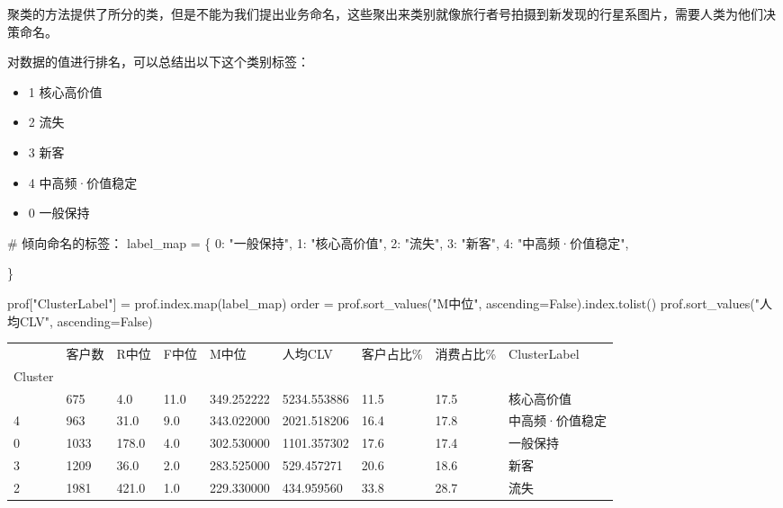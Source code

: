 \documentclass[
]{ctexart}
\newenvironment{Shaded}{\begin{snugshade}}{\end{snugshade}}
\newcommand{\BuiltInTok}[1]{\textcolor[rgb]{0.00,0.23,0.31}{#1}}
\newcommand{\CommentTok}[1]{\textcolor[rgb]{0.37,0.37,0.37}{#1}}
\newcommand{\DecValTok}[1]{\textcolor[rgb]{0.68,0.00,0.00}{#1}}
\newcommand{\NormalTok}[1]{\textcolor[rgb]{0.00,0.23,0.31}{#1}}
\newcommand{\OperatorTok}[1]{\textcolor[rgb]{0.37,0.37,0.37}{#1}}
\newcommand{\StringTok}[1]{\textcolor[rgb]{0.13,0.47,0.30}{#1}}
\newcommand{\VariableTok}[1]{\textcolor[rgb]{0.07,0.07,0.07}{#1}}
\newcounter{none} %
\providecommand{\tightlist}{%
  \setlength{\itemsep}{0pt}\setlength{\parskip}{0pt}}
\begin{document}
聚类的方法提供了所分的类，但是不能为我们提出业务命名，这些聚出来类别就像旅行者号拍摄到新发现的行星系图片，需要人类为他们决策命名。

对数据的值进行排名，可以总结出以下这个类别标签：

\begin{itemize}
\tightlist
\item
  1 核心高价值
\item
  2 流失
\item
  3 新客
\item
  4 中高频·价值稳定
\item
  0 一般保持
\end{itemize}

\begin{Shaded}
\begin{Highlighting}[]
\CommentTok{\# 倾向命名的标签：}
\NormalTok{label\_map }\OperatorTok{=}\NormalTok{ \{}
    \DecValTok{0}\NormalTok{: }\StringTok{"一般保持"}\NormalTok{,}
    \DecValTok{1}\NormalTok{: }\StringTok{"核心高价值"}\NormalTok{,}
    \DecValTok{2}\NormalTok{: }\StringTok{"流失"}\NormalTok{,}
    \DecValTok{3}\NormalTok{: }\StringTok{"新客"}\NormalTok{,}
    \DecValTok{4}\NormalTok{: }\StringTok{"中高频·价值稳定"}\NormalTok{,}
   
\NormalTok{\}}

\NormalTok{prof[}\StringTok{"ClusterLabel"}\NormalTok{] }\OperatorTok{=}\NormalTok{ prof.index.}\BuiltInTok{map}\NormalTok{(label\_map)}
\NormalTok{order }\OperatorTok{=}\NormalTok{ prof.sort\_values(}\StringTok{"M中位"}\NormalTok{, ascending}\OperatorTok{=}\VariableTok{False}\NormalTok{).index.tolist()}
\NormalTok{prof.sort\_values(}\StringTok{"人均CLV"}\NormalTok{, ascending}\OperatorTok{=}\VariableTok{False}\NormalTok{)}
\end{Highlighting}
\end{Shaded}

{\def\LTcaptype{none} %
\begin{longtable}[]{@{}lllllllll@{}}
\toprule\noalign{}
& 客户数 & R中位 & F中位 & M中位 & 人均CLV & 客户占比\% & 消费占比\% &
ClusterLabel \\
Cluster & & & & & & & & \\
\midrule\noalign{}
\endhead
\bottomrule\noalign{}
\endlastfoot
1 & 675 & 4.0 & 11.0 & 349.252222 & 5234.553886 & 11.5 & 17.5 &
核心高价值 \\
4 & 963 & 31.0 & 9.0 & 343.022000 & 2021.518206 & 16.4 & 17.8 &
中高频·价值稳定 \\
0 & 1033 & 178.0 & 4.0 & 302.530000 & 1101.357302 & 17.6 & 17.4 &
一般保持 \\
3 & 1209 & 36.0 & 2.0 & 283.525000 & 529.457271 & 20.6 & 18.6 & 新客 \\
2 & 1981 & 421.0 & 1.0 & 229.330000 & 434.959560 & 33.8 & 28.7 & 流失 \\
\end{longtable}
}
\end{document}
